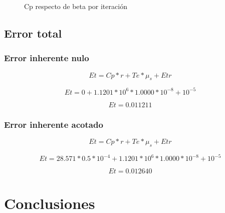 \documentclass[11pt,a4paper]{article}
\begin{document}
\begin{figure}[H]
	\caption{Cp respecto de beta por iteración}
	\label{fig:cpsb}
\end{figure}

\subsection{Error total}

\subsubsection{Error inherente nulo}

\[ Et = Cp * r + Te * \mu_s + Etr \]

\[ Et = 0 + 1.1201*10^6 * 1.0000*10^{-8} + 10^{-5} \]

\[ Et = 0.011211\]

\subsubsection{Error inherente acotado}

\[ Et = Cp * r + Te * \mu_s + Etr \]

\[ Et = 28.571 * 0.5*10^{-4} + 1.1201*10^6 * 1.0000*10^{-8} + 10^{-5} \]

\[ Et = 0.012640\]

\section{Conclusiones}
\end{document}
